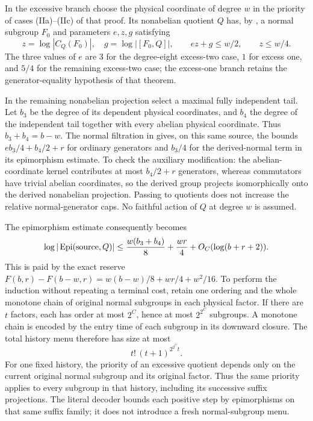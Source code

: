 In the excessive branch choose the physical coordinate of degree $w$
in the priority of cases (IIa)--(IIc) of that proof.
Its nonabelian quotient $Q$ has, by
\cite[Theorem 5.7]{RoneyDougalTracey2025}, a normal subgroup $F_0$ and
parameters $e,z,g$ satisfying
\[
 z=\log|C_Q(F_0)|,\quad g=\log|[F_0,Q]|,
 \qquad ez+g\leq w/2,\qquad z\leq w/4.
\]
The three values of $e$ are $3$ for the degree-eight excess-two case,
$1$ for excess one, and $5/4$ for the remaining excess-two case;
the excess-one branch retains the generator-equality hypothesis of
that theorem.

In the remaining nonabelian projection select a maximal fully
independent tail. Let $b_3$ be the degree of its dependent physical
coordinates, and $b_4$ the degree of the independent tail together
with every abelian physical coordinate. Thus $b_3+b_4=b-w$.
The normal filtration in
\cite[Theorem 5.5]{RoneyDougalTracey2025} gives, on this same source,
the bounds $eb_3/4+b_4/2+r$ for ordinary generators and $b_3/4$ for
the derived-normal term in its epimorphism estimate. To check the
auxiliary modification: the abelian-coordinate kernel contributes at
most $b_4/2+r$ generators, whereas commutators have trivial abelian
coordinates, so the derived group projects isomorphically onto the
derived nonabelian projection. Passing to quotients does not increase
the relative normal-generator caps. No faithful action of $Q$ at
degree $w$ is assumed.

The epimorphism estimate
\cite[Theorem 4.6]{RoneyDougalTracey2025} consequently becomes
\[
 \log|\operatorname{Epi}(\text{source},Q)|
       \leq\frac{w(b_3+b_4)}8+\frac{wr}{4}
                                     +O_C(\log(b+r+2)).
\]
This is paid by the exact reserve
$F(b,r)-F(b-w,r)=w(b-w)/8+wr/4+w^2/16$.
To perform the induction without repeating a terminal cost, retain one
ordering and the whole monotone chain of original normal subgroups in
each physical factor. If there are $t$ factors, each has order at most
$2^C$, hence at most $2^{2^C}$ subgroups. A monotone chain is encoded
by the entry time of each subgroup in its downward closure. The total history menu therefore
has size at most
\[
 t!\,(t+1)^{2^{2^C}t}.
\]
For one fixed history, the priority of an excessive quotient depends
only on the current original normal subgroup and its original factor.
Thus the same priority applies to every subgroup in that history,
including its successive suffix projections. The literal decoder bounds
each positive step by epimorphisms on that same suffix family; it does
not introduce a fresh normal-subgroup menu.

